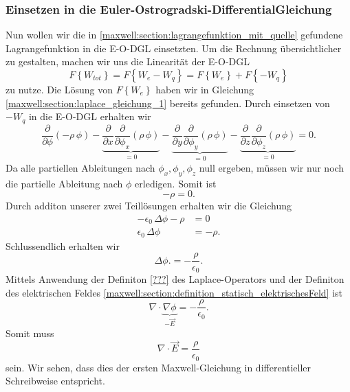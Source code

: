 \subsubsection{Einsetzen in die Euler-Ostrogradski-DifferentialGleichung}
Nun wollen wir die in \eqref{maxwell:section:lagrangefunktion_mit_quelle} gefundene Lagrangefunktion in die E-O-DGL einsetzten.
Um die Rechnung übersichtlicher zu gestalten, machen wir uns die Linearität der E-O-DGL
\begin{equation}
F\left\{W_{tot}\right\}
=
F\left\{W_e - W_q\right\}
=
F\left\{W_e\right\} + F\left\{-W_q\right\}
\label{maxwell:section:linearität_von_DGL}
\end{equation}
zu nutze.
Die Lösung von $F\left\{W_e\right\}$ haben wir in Gleichung \eqref{maxwell:section:laplace_gleichung_1} bereits gefunden.
Durch einsetzen von $-W_q$ in die E-O-DGL erhalten wir
\[
\frac{\partial}{\partial\phi}\left(-\rho\,\phi\right) - \underbrace{\frac{\partial}{\partial x}\frac{\partial}{\partial\phi_x}\left(\rho\,\phi\right)}_{=0} - \underbrace{\frac{\partial}{\partial y}\frac{\partial}{\partial\phi_y}\left(\rho\,\phi\right)}_{=0} - \underbrace{\frac{\partial}{\partial z}\frac{\partial}{\partial\phi_z}\left(\rho\,\phi\right)}_{=0}
=
0.
\]
Da alle partiellen Ableitungen nach $\phi_x, \phi_y, \phi_z$ null ergeben, müssen wir nur noch die partielle Ableitung nach $\phi$ erledigen.
Somit ist
\begin{equation}
-\rho
=
0.
\end{equation}
Durch additon unserer zwei Teillösungen erhalten wir die Gleichung
\begin{align*}
-\epsilon_0\,\Delta\phi - \rho
&=
0
\\
\epsilon_0\,\Delta\phi
&=
-\rho.
\end{align*}
Schlussendlich erhalten wir
\begin{equation}
\Delta\phi.
=
-\frac{\rho}{\epsilon_0}.
\label{maxwell:section:erste_maxwellgleichung_1}
\end{equation}
Mittels Anwendung der Definiton \ref{???} des Laplace-Operators und der Definiton des elektrischen Feldes \eqref{maxwell:section:definition_statisch_elektrischesFeld} ist
\[
\nabla\cdot\underbrace{\nabla\phi}_{-\vec{E}}
=
-\frac{\rho}{\epsilon_0}.
\]
Somit muss
\begin{equation}
\nabla\cdot\vec{E}
=
\frac{\rho}{\epsilon_0}
\label{maxwell:section:erste_maxwellgleichung_2}
\end{equation}
sein.
Wir sehen, dass dies der ersten Maxwell-Gleichung in differentieller Schreibweise entspricht.

